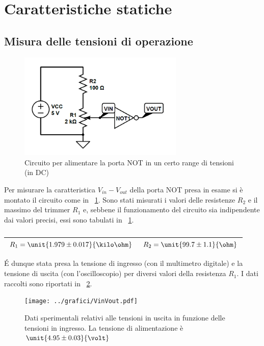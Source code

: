 \documentclass[a4paper,10pt]{article}
\begin{document}
\section{Caratteristiche statiche}

\subsection{Misura delle tensioni di operazione}

\begin{figure}[H]
	\centering
	\includegraphics[width=0.7\textwidth]{../grafici/NOTin.png}
	\caption{Circuito per alimentare la porta NOT in un certo range di tensioni (in DC)}
	\label{fig:NOTin}
\end{figure}

Per misurare la caratteristica $V_{in}-V_{out}$ della porta NOT presa in esame si è montato il circuito come in \figurename{~\ref{fig:NOTin}}. Sono stati misurati i valori delle resistenze $R_2$ e il massimo del trimmer $R_1$ e, sebbene il funzionamento del circuito sia indipendente dai valori precisi, essi sono tabulati in  \tablename{~\ref{Res1}}.

\begin{table}[H]
	\centering
	\begin{tabular}{c|c}
		\hline
		$R_1 = \unit{1.979 \pm 0.017}{\kilo\ohm}$ & $R_2 = \unit{99.7 \pm 1.1}{\ohm}$\\
		\hline
	\end{tabular}
	\caption{}
	\label{Res1}
\end{table}

\'E dunque stata presa la tensione di ingresso (con il multimetro digitale) e la tensione di uscita (con l'oscilloscopio) per diversi valori della resistenza $R_1$. I dati raccolti sono riportati in \figurename{~\ref{fig:VinVout}}.


\begin{figure}[H]
	\centering
	\texttt{[image: ../grafici/VinVout.pdf]}
	\caption{Dati sperimentali relativi alle tensioni in uscita in funzione delle tensioni in ingresso. La tensione di alimentazione è $ \unit{4.95 \pm 0.03}{\volt}$}
	\label{fig:VinVout}
\end{figure}
\end{document}
